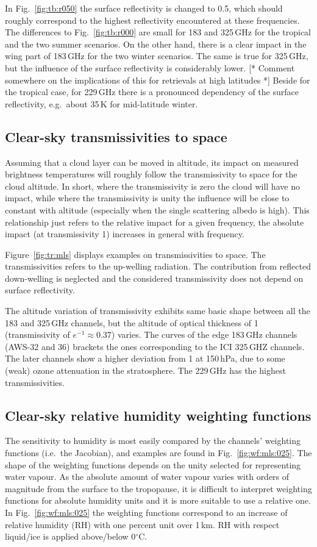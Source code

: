 \documentclass[12pt]{article}
\begin{document}
In Fig.~\ref{fig:tb:r050} the surface reflectivity is changed to 0.5, which
should roughly correspond to the highest reflectivity encountered at these
frequencies. The differences to Fig.~\ref{fig:tb:r000}  are small for 183 and
325\,GHz for the tropical and the two summer scenarios. On the other hand,
there is a clear impact in the wing part of 183\,GHz for the two winter
scenarios. The same is true for 325\,GHz, but the influence of the surface
reflectivity is considerably lower. [* Comment somewhere on the implications of
this for retrievals at high latitudes *] Beside for the tropical case, for
229\,GHz there is a pronounced dependency of the surface reflectivity, e.g.\
about 35\,K for mid-latitude winter.


\subsection{Clear-sky transmissivities to space}
%
Assuming that a cloud layer can be moved in altitude, its impact on measured
brightness temperatures will roughly follow the transmissivity to space for the
cloud altitude. In short, where the transmissivity is zero the cloud will have
no impact, while where the transmissivity is unity the influence will be close
to constant with altitude (especially when the single scattering albedo is
high). This relationship just refers to the relative impact for a
given frequency, the absolute impact (at transmissivity 1) increases in general
with frequency. 

Figure~\ref{fig:tr:mls} displays examples on transmissivities to space. The
transmissivities refers to the up-welling radiation. The contribution from
reflected down-welling is neglected and the considered transmissivity does not
depend on surface reflectivity.

The altitude variation of transmissivity exhibits same basic shape between all
the 183 and 325\,GHz channels, but the altitude of optical thickness of 1
(transmissivity of $e^{-1}\approx0.37$) varies. The curves of the edge 183\,GHz
channels (AWS-32 and 36) brackets the ones corresponding to the ICI 325\,GHZ
channels. The later channels show a higher deviation from 1 at 150\,hPa, due to
some (weak) ozone attenuation in the stratosphere. The 229\,GHz has the highest
transmissivities.


\subsection{Clear-sky relative humidity weighting functions}
%
The sensitivity to humidity is most easily compared by the channels' weighting
functions (i.e.\ the Jacobian), and examples are found in
Fig.~\ref{fig:wf:mls:025}. The shape of the weighting functions depends on the
unity selected for representing water vapour. As the absolute amount of water
vapour varies with orders of magnitude from the surface to the tropopause, it
is difficult to interpret weighting functions for absolute humidity units and
it is more suitable to use a relative one. In Fig.~\ref{fig:wf:mls:025} the
weighting functions correspond to an increase of relative humidity (RH) with one
percent unit over 1\,km. RH with respect liquid/ice is applied above/below
0$^\circ$C.
\end{document}
